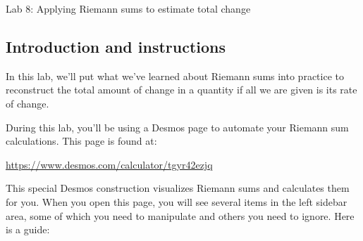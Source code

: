 \documentclass[11pt,letterpaper]{article}
\begin{document}
\begin{flushright}
	\begin{Large}
		Lab 8: Applying Riemann sums to estimate total change
	\end{Large}
\end{flushright}

\subsection*{Introduction and instructions} 

In this lab, we'll put what we've learned about Riemann sums into practice to reconstruct the total amount of change in a quantity if all we are given is its rate of change. 

During this lab, you'll be using a Desmos page to automate your Riemann sum calculations. This page is found at: 
\begin{center}
    \url{https://www.desmos.com/calculator/tgyr42ezjq} 
\end{center}
This special Desmos construction visualizes Riemann sums and calculates them for you. When you open this page, you will see several items in the left sidebar area, some of which you need to manipulate and others you need to ignore. Here is a guide: 
\end{document}
